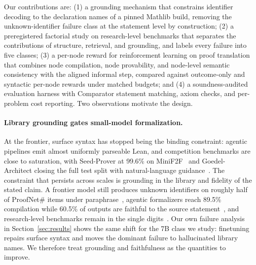 \documentclass[sigconf,anonymous]{aamas}
\begin{document}
Our contributions are: (1) a grounding mechanism that constrains identifier
decoding to the declaration names of a pinned Mathlib build, removing the
unknown-identifier failure class at the statement level by construction; (2) a
preregistered factorial study on research-level benchmarks that separates the
contributions of structure, retrieval, and grounding, and labels every failure
into five classes; (3) a per-node reward for reinforcement learning on proof
translation that combines node compilation, node provability, and node-level
semantic consistency with the aligned informal step, compared against
outcome-only and syntactic per-node rewards under matched budgets; and (4) a
soundness-audited evaluation harness with Comparator statement matching, axiom
checks, and per-problem cost reporting. Two observations motivate the design.


\paragraph{Library grounding gates small-model formalization.} At the frontier,
surface syntax has stopped being the binding constraint: agentic pipelines emit
almost uniformly parseable Lean, and competition benchmarks are close to
saturation, with Seed-Prover at 99.6\% on MiniF2F~\citep{seedprover2025} and
Goedel-Architect closing the full test split with natural-language
guidance~\citep{goedelarchitect2026}. The constraint that persists across scales
is grounding in the library and fidelity of the stated claim. A frontier model
still produces unknown identifiers on roughly half of ProofNet\# items under
paraphrase~\citep{surfacesens2026}, agentic formalizers reach 89.5\% compilation
while 60.5\% of outputs are faithful to the source
statement~\citep{beyondcompilation2026}, and research-level benchmarks remain in
the single digits~\citep{rlmeval2025, fate2025}. Our own failure analysis in
Section~\ref{sec:results} shows the same shift for the 7B class we study:
finetuning repairs surface syntax and moves the dominant failure to hallucinated
library names. We therefore treat grounding and faithfulness as the quantities
to improve.
\end{document}
